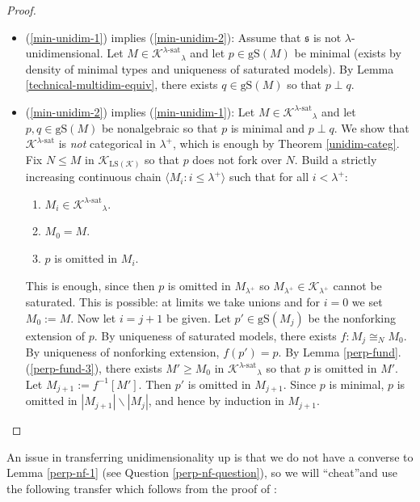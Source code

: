 \documentclass[12pt]{amsart}
\theoremstyle{definition}
\begin{document}
\begin{proof} \
  \begin{itemize}
    \item (\ref{min-unidim-1}) implies (\ref{min-unidim-2}): Assume that ${\mathfrak{s}}$ is not $\lambda$-unidimensional. Let $M \in {{{{\mathcal{K}}}^{{{\lambda}}\text{-sat}}}}_\lambda$ and let $p \in {\text{gS}} (M)$ be minimal (exists by density of minimal types and uniqueness of saturated models). By Lemma \ref{technical-multidim-equiv}, there exists $q \in {\text{gS}} (M)$ so that $p \perp q$.
    \item (\ref{min-unidim-2}) implies (\ref{min-unidim-1}): Let $M \in {{{{\mathcal{K}}}^{{{\lambda}}\text{-sat}}}}_\lambda$ and let $p, q \in {\text{gS}} (M)$ be nonalgebraic so that $p$ is minimal and $p \perp q$. We show that ${{{{\mathcal{K}}}^{{{\lambda}}\text{-sat}}}}$ is \emph{not} categorical in $\lambda^+$, which is enough by Theorem \ref{unidim-categ}. Fix $N {\le} M$ in ${\mathcal{K}}_{{\text{LS}} ({\mathcal{K}})}$ so that $p$ does not fork over $N$. Build a strictly increasing continuous chain ${\langle {M_i : i \le \lambda^+} \rangle}$ such that for all $i < \lambda^+$:

  \begin{enumerate}
    \item $M_i \in {{{{\mathcal{K}}}^{{{\lambda}}\text{-sat}}}}_\lambda$.
    \item $M_0 = M$.
    \item $p$ is omitted in $M_i$.
  \end{enumerate}

  This is enough, since then $p$ is omitted in $M_{\lambda^+}$ so $M_{\lambda^+} \in {\mathcal{K}}_{\lambda^+}$ cannot be saturated. This is possible: at limits we take unions and for $i = 0$ we set $M_0 := M$. Now let $i = j + 1$ be given. Let $p' \in {\text{gS}} (M_j)$ be the nonforking extension of $p$. By uniqueness of saturated models, there exists $f: M_j \cong_{N} M_0$. By uniqueness of nonforking extension, $f (p') = p$. By Lemma \ref{perp-fund}.(\ref{perp-fund-3}), there exists $M' {\ge} M_0$ in ${{{{\mathcal{K}}}^{{{\lambda}}\text{-sat}}}}_\lambda$ so that $p$ is omitted in $M'$. Let $M_{j + 1} := f^{-1}[M']$. Then $p'$ is omitted in $M_{j + 1}$. Since $p$ is minimal, $p$ is omitted in $|M_{j + 1}| \backslash |M_j|$, and hence by induction in $M_{j + 1}$.
  \end{itemize}
\end{proof}

An issue in transferring unidimensionality up is that we do not have a converse to Lemma \ref{perp-nf-1} (see Question \ref{perp-nf-question}), so we will ``cheat''and use the following transfer which follows from the proof of \cite[Theorem 6.3]{tamenessthree}:
\end{document}
